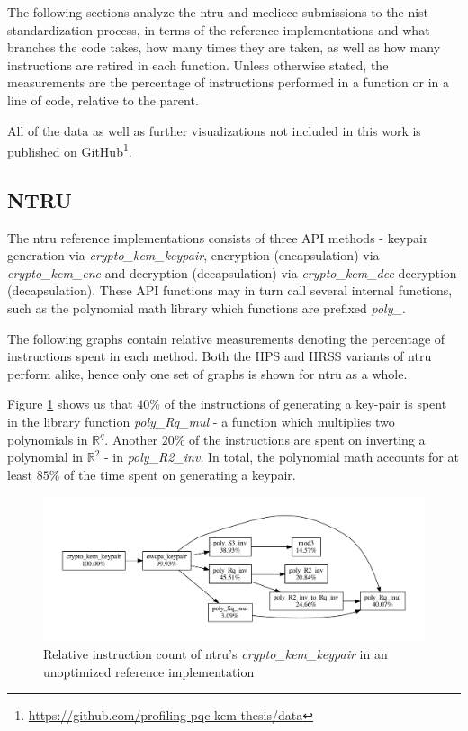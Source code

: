 The following sections analyze the \gls{ntru} and \gls{mceliece} submissions to the \gls{nist} standardization process, in terms of the reference implementations and what branches the code takes, how many times they are taken, as well as how many instructions are retired in each function. Unless otherwise stated, the measurements are the percentage of instructions performed in a function or in a line of code, relative to the parent.

All of the data as well as further visualizations not included in this work is published on GitHub\footnote{\href{https://github.com/profiling-pqc-kem-thesis/data}{https://github.com/profiling-pqc-kem-thesis/data}}.

\subsection{NTRU}

The \gls{ntru} reference implementations consists of three API methods - keypair generation via \textit{crypto\_kem\_keypair}, encryption (encapsulation) via \textit{crypto\_kem\_enc} and decryption (decapsulation) via \textit{crypto\_kem\_dec}  decryption (decapsulation). These API functions may in turn call several internal functions, such as the polynomial math library which functions are prefixed \textit{poly\_}.

The following graphs contain relative measurements denoting the percentage of instructions spent in each method. Both the HPS and HRSS variants of \gls{ntru} perform alike, hence only one set of graphs is shown for \gls{ntru} as a whole.

Figure \ref{figure:result:hot-paths:ntru:crypto_kem_keypair} shows us that $40\%$ of the instructions of generating a key-pair is spent in the library function \textit{poly\_Rq\_mul} - a function which multiplies two polynomials in $\mathbb{R}^q$. Another $20\%$ of the instructions are spent on inverting a polynomial in $\mathbb{R}^2$ - in \textit{poly\_R2\_inv}. In total, the polynomial math accounts for at least $85\%$ of the time spent on generating a keypair.

\begin{figure}[H]
    \centering
    \includegraphics[scale=0.5]{chapters/results/hot-paths/ntru/crypto_kem_keypair.pdf}
    \caption{Relative instruction count of \gls{ntru}'s \textit{crypto\_kem\_keypair} in an unoptimized reference implementation}
    \label{figure:result:hot-paths:ntru:crypto_kem_keypair}
\end{figure}

